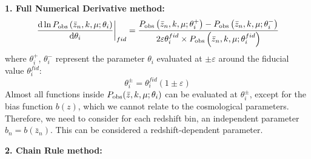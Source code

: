 \textbf{1. Full Numerical Derivative method:}
	\begin{equation}
	\left.\frac{\mbox{d}\ln P_{{\rm obs}}\left(\bar{z}_n,k,\mu;\theta_{i}\right)}{\mbox{d}\theta_{i}}\right|_{fid}=\frac{P_{{\rm obs}}\left(\bar{z}_n,k,\mu;\theta_{i}^{+}\right)-P_{{\rm obs}}\left(\bar{z}_n,k,\mu;\theta_{i}^{-}\right)}{2\varepsilon\theta_{i}^{fid}\times P_{{\rm obs}}\left(\bar{z}_n,k,\mu;\theta_{i}^{fid}\right)}
	\end{equation}
	where $\theta_{i}^{+}$, $\theta_{i}^{-}$ represent the parameter
	$\theta_{i}$ evaluated at $\pm\varepsilon$ around the fiducial value
	$\theta_{i}^{fid}$:
	\begin{equation}
	\theta_{i}^{\pm}=\theta_{i}^{fid}(1\pm\varepsilon)
	\end{equation}
Almost all functions inside $P_{{\rm obs}}(\bar{z},k,\mu;\theta_{i})$
can be evaluated at $\theta_{i}^{\pm}$, except for the bias function $b(z)$,
which we cannot relate to the cosmological parameters. Therefore, we need to consider 
for each redshift bin, an independent parameter $b_n = b(\bar{z}_n)$. This can be 
considered a redshift-dependent parameter.

\textbf{2. Chain Rule method:}


